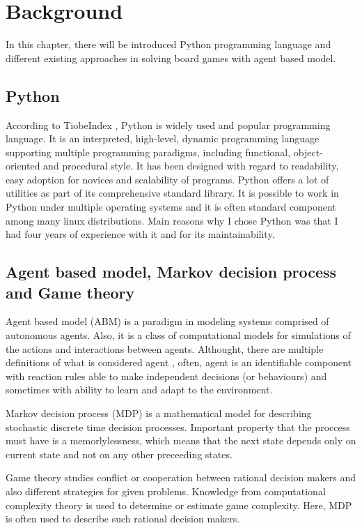 \chapter{Background}\label{chap:2}
  In this chapter, there will be introduced Python programming language and
different existing approaches in solving board games with agent based model.

\section{Python}
According to TiobeIndex \cite{tiobeIndex}, Python is widely used and popular
programming language. It is an interpreted, high-level, dynamic programming
language supporting multiple programming paradigms, including functional,
object-oriented and procedural style. It has been designed with regard to
readability, easy adoption for novices and scalability of programs. Python
offers a lot of utilities as part of its comprehensive standard library. It is
possible to work in Python under multiple operating systems and it is often
standard component among many linux distributions. Main reasons why I chose
Python was that I had four years of experience with it and for its
maintainability.

\section{Agent based model, Markov decision process and Game theory}
Agent based model (ABM) is a paradigm in modeling systems comprised
of autonomous agents. Also, it is a class of computational models for
simulations of the actions and interactions between agents. Althought, there
are multiple definitions of what is considered agent \cite{abm}, often, agent
is an identifiable component with reaction rules able to make independent
decisions (or behaviours) and sometimes with ability to learn and adapt to
the environment.

Markov decision process (MDP) is a mathematical model for describing stochastic
discrete time decision processes. Important property that the proccess must
have is a memorlylessness, which means that the next state depends only
on current state and not on any other preceeding states.

Game theory studies conflict or cooperation between rational decision makers
and also different strategies for given problems. Knowledge from computational
complexity theory is used to determine or estimate game complexity. Here, MDP
is often used to describe such rational decision makers.

